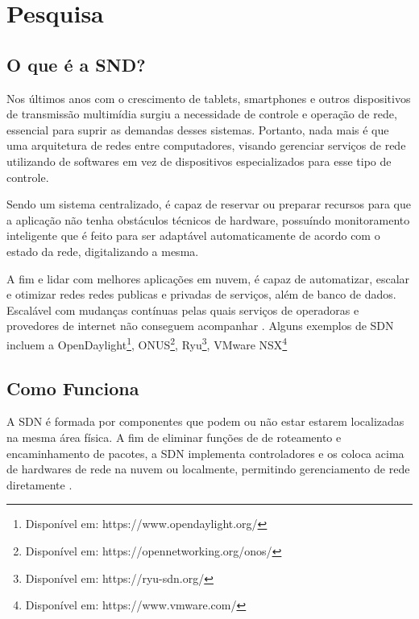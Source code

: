 \chapter{Pesquisa}
\label{cap:pesquisa}

\section{O que é a SND?}
Nos últimos anos com o crescimento de tablets, smartphones e outros dispositivos de transmissão multimídia
surgiu a necessidade de controle e operação de rede, essencial para suprir as demandas desses sistemas.
Portanto, nada mais é que uma arquitetura de redes entre computadores, visando gerenciar serviços de rede
utilizando de softwares em vez de dispositivos especializados para esse tipo de controle.

Sendo um sistema centralizado, é capaz de reservar ou preparar recursos para que a aplicação não tenha
obstáculos técnicos de hardware, possuíndo monitoramento inteligente que é feito para ser adaptável automaticamente
de acordo com o estado da rede, digitalizando a mesma.

A fim e lidar com melhores aplicações em nuvem, é capaz de automatizar, escalar e otimizar redes redes publicas e privadas
de serviços, além de banco de dados. Escalável com mudanças contínuas pelas quais serviços de operadoras e provedores de
internet não conseguem acompanhar \cite{stefanini_performance2025}.
Alguns exemplos de SDN incluem a OpenDaylight\footnote{Disponível em: https://www.opendaylight.org/},
ONUS\footnote{Disponível em: https://opennetworking.org/onos/}, Ryu\footnote{Disponível em: https://ryu-sdn.org/},
VMware NSX\footnote{Disponível em: https://www.vmware.com/}

\section{Como Funciona}
A SDN é formada por componentes que podem ou não estar estarem localizadas na mesma área física.
A fim de eliminar funções de de roteamento e encaminhamento de pacotes, a SDN implementa controladores
e os coloca acima de hardwares de rede na nuvem ou localmente, permitindo gerenciamento de rede
diretamente \cite{ibm_sdn}.

